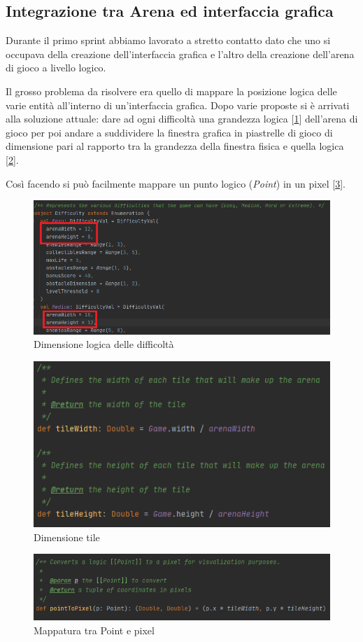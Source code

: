 \subsection{Integrazione tra Arena ed interfaccia grafica}
Durante il primo sprint abbiamo lavorato a stretto contatto dato che uno si occupava della creazione dell'interfaccia grafica e l'altro della creazione dell'arena di gioco a livello logico.

Il grosso problema da risolvere era quello di mappare la posizione logica delle varie entità all'interno di un'interfaccia grafica.
Dopo varie proposte si è arrivati alla soluzione attuale: dare ad ogni difficoltà una grandezza logica [\ref{difficulty}] dell'arena di gioco per poi andare a suddividere la finestra grafica in piastrelle di gioco di dimensione pari al rapporto tra la grandezza della finestra fisica e quella logica [\ref{tile}].

Così facendo si può facilmente mappare un punto logico (\textit{Point}) in un pixel [\ref{conversion}].

\begin{figure}[H]
    \centering
      \includegraphics[width=13cm]{res/6-implementazione/chianapasini/difficulty.png}
      \caption{Dimensione logica delle difficoltà}
      \label{difficulty}
    \end{figure}
    
\begin{figure}[H]
    \centering
      \includegraphics[width=13cm]{res/6-implementazione/chianapasini/tile.png}
      \caption{Dimensione tile}
      \label{tile}
    \end{figure}
    
\begin{figure}[H]
    \centering
      \includegraphics[width=13cm]{res/6-implementazione/chianapasini/conversion.png}
      \caption{Mappatura tra Point e pixel}
      \label{conversion}
    \end{figure}